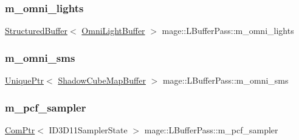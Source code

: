 \hypertarget{classmage_1_1_l_buffer_pass_afc2754b9d3a3b1c2171cd1a6e5b2349d}{}\label{classmage_1_1_l_buffer_pass_afc2754b9d3a3b1c2171cd1a6e5b2349d} 
\subsubsection{\texorpdfstring{m\+\_\+omni\+\_\+lights}{m\_omni\_lights}}
{\footnotesize\ttfamily \hyperlink{classmage_1_1_structured_buffer}{Structured\+Buffer}$<$ \hyperlink{structmage_1_1_omni_light_buffer}{Omni\+Light\+Buffer} $>$ mage\+::\+L\+Buffer\+Pass\+::m\+\_\+omni\+\_\+lights\hspace{0.3cm}{\ttfamily [private]}}

\hypertarget{classmage_1_1_l_buffer_pass_a083245bbfa560e2e16fd829a30ad857d}{}\label{classmage_1_1_l_buffer_pass_a083245bbfa560e2e16fd829a30ad857d} 
\subsubsection{\texorpdfstring{m\+\_\+omni\+\_\+sms}{m\_omni\_sms}}
{\footnotesize\ttfamily \hyperlink{namespacemage_a3316d7143a973e37adf1110f2e80ca31}{Unique\+Ptr}$<$ \hyperlink{structmage_1_1_shadow_cube_map_buffer}{Shadow\+Cube\+Map\+Buffer} $>$ mage\+::\+L\+Buffer\+Pass\+::m\+\_\+omni\+\_\+sms\hspace{0.3cm}{\ttfamily [private]}}

\hypertarget{classmage_1_1_l_buffer_pass_aaf8dacd30171f31fe2a898fbdd91a990}{}\label{classmage_1_1_l_buffer_pass_aaf8dacd30171f31fe2a898fbdd91a990} 
\subsubsection{\texorpdfstring{m\+\_\+pcf\+\_\+sampler}{m\_pcf\_sampler}}
{\footnotesize\ttfamily \hyperlink{namespacemage_ae74f374780900893caa5555d1031fd79}{Com\+Ptr}$<$ I\+D3\+D11\+Sampler\+State $>$ mage\+::\+L\+Buffer\+Pass\+::m\+\_\+pcf\+\_\+sampler\hspace{0.3cm}{\ttfamily [private]}}

